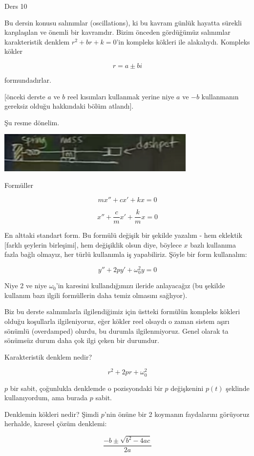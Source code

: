 \documentclass[12pt,fleqn]{article}\usepackage{../../common}
\begin{document}
Ders 10

Bu dersin konusu salınımlar (oscillations), ki bu kavram günlük hayatta
sürekli karşılaşılan ve önemli bir kavramdır. Bizim önceden gördüğümüz
salınımlar karakteristik denklem $r^2 + br + k = 0$'in kompleks kökleri ile
alakalıydı. Kompleks kökler 

$$ r = a \pm bi $$

formundadırlar. 

[önceki derste $a$ ve $b$ reel kısımları kullanmak yerine niye $a$ ve $-b$
kullanmanın gereksiz olduğu hakkındaki bölüm atlandı].

Şu resme dönelim. 

\includegraphics[height=2cm]{10_1.png}

Formüller

$$ mx'' + cx' + kx = 0 $$

$$ x'' + \frac{c}{m}x' + \frac{k}{m}x = 0 $$

En alttaki standart form. Bu formülü değişik bir şekilde yazalım - hem
eklektik [farklı şeylerin birleşimi], hem değişiklik olsun diye, böylece
$x$ bazlı kullanıma fazla bağlı olmayız, her türlü kullanımla iş
yapabiliriz. Şöyle bir form kullanalım:

$$ y'' + 2p y' + \omega_0^2y = 0 $$

Niye 2 ve niye $\omega_0$'in karesini kullandığımızı ileride anlayacağız
(bu şekilde kullanım bazı ilgili formüllerin daha temiz olmasını sağlıyor).

Biz bu derste salınımlarla ilgilendiğimiz için üstteki formülün kompleks
kökleri olduğu koşullarla ilgileniyoruz, eğer kökler reel olsaydı o zaman
sistem aşırı sönümlü (overdamped) olurdu, bu durumla ilgilenmiyoruz. Genel
olarak ta sönümsüz durum daha çok ilgi çeken bir durumdur.

Karakteristik denklem nedir?

$$ r^2 + 2pr + \omega_0^2 $$

$p$ bir sabit, çoğunlukla denklemde o pozisyondaki bir $p$ değişkenini
$p(t)$ şeklinde kullanıyordum, ama burada $p$ sabit. 

Denklemin kökleri nedir? Şimdi $p$'nin önüne bir 2 koymanın faydalarını
görüyoruz herhalde, karesel çözüm denklemi:

$$ \frac{-b \pm \sqrt{b^2-4ac}}{2a} $$
\end{document}
